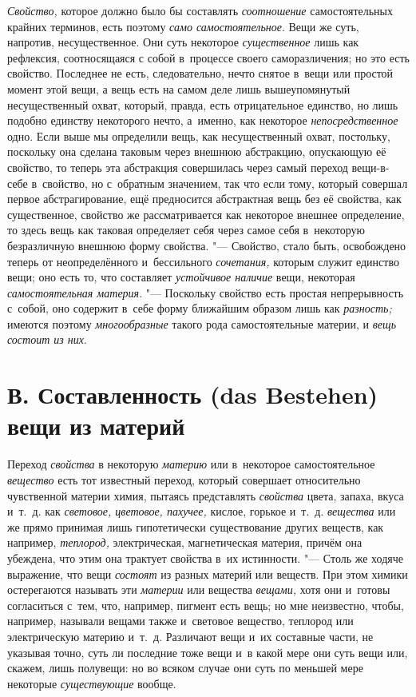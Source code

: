 {\em Свойство,} которое должно было бы составлять
{\em соотношение} самостоятельных крайних терминов,
есть поэтому {\em само самостоятельное}. Вещи же суть,
напротив, несущественное. Они суть некоторое
{\em существенное} лишь как рефлексия, соотносящаяся с
собой в~процессе своего саморазличения; но это есть свойство. Последнее не
есть, следовательно, нечто снятое в~вещи или простой момент этой вещи, а
вещь есть на самом деле лишь вышеупомянутый несущественный охват, который,
правда, есть отрицательное единство, но лишь подобно единству некоторого
нечто, а~именно, как некоторое {\em непосредственное}
одно. Если выше мы определили вещь, как несущественный охват, постольку,
поскольку она сделана таковым через внешнюю абстракцию, опускающую её
свойство, то теперь эта абстракция совершилась через самый переход
вещи-в-себе в~свойство, но с~обратным значением, так что если тому, который
совершал первое абстрагирование, ещё предносится абстрактная вещь без её
свойства, как существенное, свойство же рассматривается как некоторое
внешнее определение, то здесь вещь как таковая определяет себя через самое
себя в~некоторую безразличную внешнюю форму свойства. "--- Свойство, стало
быть, освобождено теперь от неопределённого и~бессильного
{\em сочетания,} которым служит единство вещи; оно есть
то, что составляет {\em устойчивое наличие} вещи,
некоторая {\em самостоятельная материя}. "--- Поскольку
свойство есть простая непрерывность с~собой, оно содержит в~себе форму
ближайшим образом лишь как {\em разность;} имеются
поэтому {\em многообразные} такого рода самостоятельные
материи, и {\em вещь состоит из них}.


\section[В. Составленность (das Bestehen) вещи из материй]
{В. Составленность (das Bestehen) вещи из материй}

Переход {\em свойства} в
некоторую {\em материю} или в~некоторое самостоятельное
{\em вещество} есть тот известный переход, который
совершает относительно чувственной материи химия, пытаясь представлять
{\em свойства} цвета, запаха, вкуса и~т.~д. как
{\em световое, цветовое, пахучее,} кислое, горькое
и~т.~д. {\em вещества} или же прямо принимая лишь
гипотетически существование других веществ, как например,
{\em теплород,} электрическая, магнетическая материя,
причём она убеждена, что этим она трактует свойства в~их истинности. "---
Столь же ходяче выражение, что вещи {\em состоят} из
разных материй или веществ. При этом химики остерегаются называть эти
{\em материи} или вещества
{\em вещами,} хотя они и~готовы согласиться с~тем, что,
например, пигмент есть вещь; но мне неизвестно, чтобы, например, называли
вещами также и~световое вещество, теплород или электрическую материю
и~т.~д. Различают вещи и~их составные части, не указывая точно, суть ли
последние тоже вещи и~в какой мере они суть вещи или, скажем, лишь
полувещи: но во всяком случае они суть по меньшей мере некоторые
{\em существующие} вообще.

